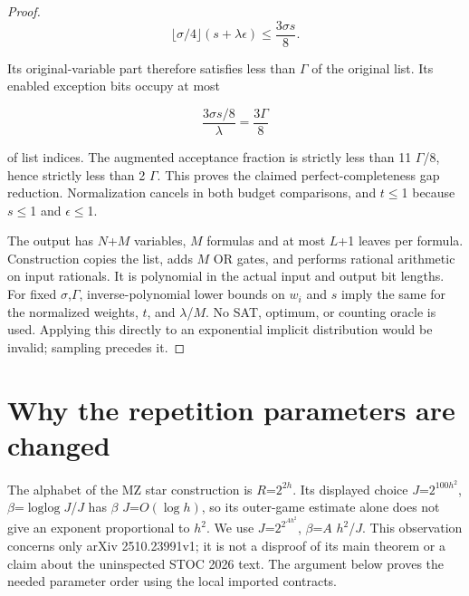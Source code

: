 \begin{proof}
\begin{equation}\label{eq:5}
\lfloor\sigma/4\rfloor(s+\lambda\epsilon)\le\frac{3\sigma s}{8}.
\end{equation}

Its original-variable part therefore satisfies less than \(\Gamma\) of the original list. Its enabled exception bits occupy at most

\begin{equation}\label{eq:6}
\frac{3\sigma s/8}{\lambda}=\frac{3\Gamma}{8}
\end{equation}

of list indices. The augmented acceptance fraction is strictly less than 11 \(\Gamma\)/8, hence strictly less than 2 \(\Gamma\). This proves the claimed perfect-completeness gap reduction. Normalization cancels in both budget comparisons, and \(t\)\(\le\)1 because \(s\)\(\le\)1 and \(\epsilon\)\(\le\)1.

The output has \(N\)+\(M\) variables, \(M\) formulas and at most \(L\)+1 leaves per formula. Construction copies the list, adds \(M\) OR gates, and performs rational arithmetic on input rationals. It is polynomial in the actual input and output bit lengths. For fixed \(\sigma\),\(\Gamma\), inverse-polynomial lower bounds on \(w_i\) and \(s\) imply the same for the normalized weights, \(t\), and \(\lambda\)/\(M\). No SAT, optimum, or counting oracle is used. Applying this directly to an exponential implicit distribution would be invalid; sampling precedes it.\end{proof}

\section{Why the repetition parameters are changed}\label{sec:5}
The alphabet of the MZ star construction is \(R\)=\(2^{2h}\). Its displayed choice \(J\)=\(2^{100h^2}\), \(\beta\)=\(\operatorname{loglog}J\)/\(J\) has \(\beta\) \(J\)=\(O(\log h)\), so its outer-game estimate alone does not give an exponent proportional to \(h^2\). We use \(J\)=\(2^{2^{A h^2}}\), \(\beta\)=\(A\) \(h^2\)/\(J\). This observation concerns only arXiv 2510.23991v1; it is not a disproof of its main theorem or a claim about the uninspected STOC 2026 text. The argument below proves the needed parameter order using the local imported contracts.

